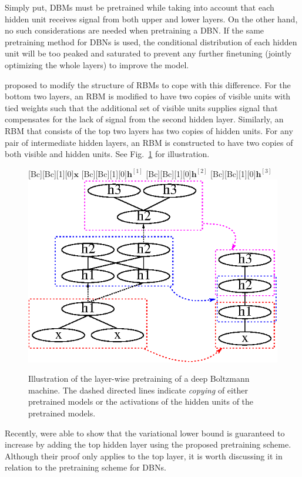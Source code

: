 \documentclass[dissertation,nocontribution,draft*]{aaltoseries}
\newcommand{\qlay}[1]{\left[#1\right]}
\newcommand{\vect}[1]{\mathbf{#1}}
\newcommand{\vh}[0]{\vect{h}}
\newcommand{\vx}[0]{\vect{x}}
\begin{document}
Simply put, DBMs must be pretrained while taking into
account that each hidden unit receives signal from both
upper and lower layers. On the other hand, no such
considerations are needed when pretraining a DBN. If the same
pretraining method for DBNs is used, the conditional
distribution of each hidden unit will be too peaked and
saturated to prevent any further finetuning (jointly
optimizing the whole layers) to improve the model.

\citet{Salakhutdinov2009a} proposed to modify the
structure of RBMs to cope with this difference. For the
bottom two layers, an RBM is modified to have two copies of
visible units with tied weights such that the
additional set of visible units supplies signal that
compensates for the lack of signal from the second hidden
layer. Similarly, an RBM that consists of the top two layers
has two copies of hidden units. For any pair of intermediate
hidden layers, an RBM is constructed to have two copies of
both visible and hidden units. See Fig.~\ref{fig:dbm_pre}
for illustration.

\begin{figure}[t]
    \centering
    [Bc][Bc][1][0]{$\vx$}
    [Bc][Bc][1][0]{$\vh^{\qlay{1}}$}
    [Bc][Bc][1][0]{$\vh^{\qlay{2}}$}
    [Bc][Bc][1][0]{$\vh^{\qlay{3}}$}
    \includegraphics[width=0.73\columnwidth]{figures/pretrain_dbm.eps}
    \caption{Illustration of the layer-wise pretraining of
    a deep Boltzmann machine. The dashed directed lines
    indicate \textit{copying} of either pretrained models or
    the activations of the hidden units of the pretrained
    models.}
    \label{fig:dbm_pre}
\end{figure}

Recently, \citet{Salakhutdinov2012nc} were able to show that
the variational lower bound is guaranteed to increase by
adding the top hidden layer using the proposed pretraining
scheme. Although their proof only applies to the top layer,
it is worth discussing it in relation to the pretraining
scheme for DBNs.
\end{document}
